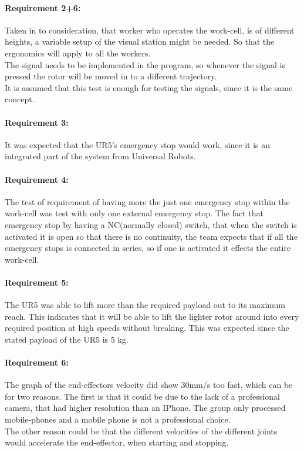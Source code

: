 \paragraph{Requirement 2+6:}
Taken in to consideration, that worker who operates the work-cell, is of different heights, a variable setup of the visual station might be needed. So that the ergonomics will apply to all the workers.\\
The signal needs to be implemented in the program, so whenever the signal is pressed the rotor will be moved in to a different trajectory.\\
It is assumed that this test is enough for testing the signals, since it is the same concept.

\paragraph{Requirement 3:}
It was expected that the UR5's emergency stop would work, since it is an integrated part of the system from Universal Robots. 

\paragraph{Requirement 4:}

The test of requirement of having more the just one emergency stop within the work-cell was test with only one external emergency stop. The fact that emergency stop by having a NC(normally closed) switch, that when the switch is activated it is open so that there is no continuity, the team expects that if all the emergency stops is connected in series, so if one is activated it effects the entire work-cell.  

\paragraph{Requirement 5:}
The UR5 was able to lift more than the required payload out to its maximum reach. This indicates that it will be able to lift the lighter rotor around into every required position at high speeds without breaking. This was expected since the stated payload of the UR5 is 5 kg. 


\paragraph{Requirement 6:}
The graph of the end-effectors velocity did show 30mm/s too fast, which can be for  two reasons. The first is that it could be due to the lack of a professional camera, that had higher resolution than an IPhone. The group only processed mobile-phones and a mobile phone is not a professional choice.\\
The other reason could be that the different velocities of the different joints would accelerate the end-effector, when starting and stopping. 


